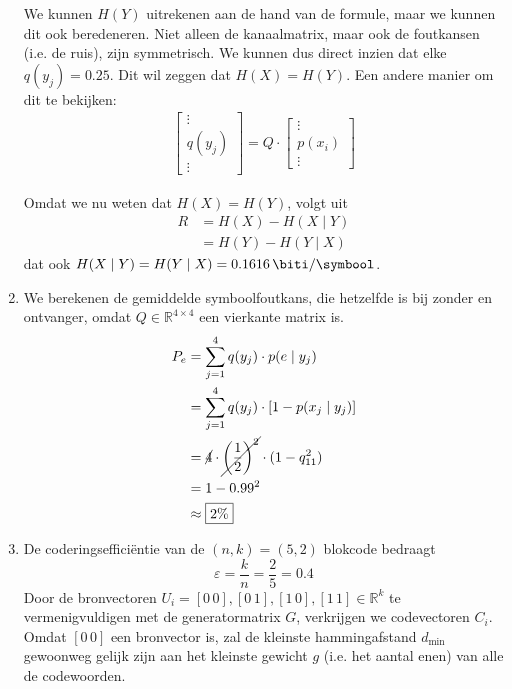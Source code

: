 \documentclass[kulak]{kulakarticle}
\newcommand{\R}{\mathbb{R}} %
\begin{document}
\begin{enumerate}
		We kunnen \(H(Y)\) uitrekenen aan de hand van de formule, maar we kunnen dit ook beredeneren. Niet alleen de kanaalmatrix, maar ook de foutkansen (i.e. de ruis), zijn symmetrisch. We kunnen dus direct inzien dat elke \(q(y_j) = 0.25\). Dit wil zeggen dat \(H(X)=H(Y)\). Een andere manier om dit te bekijken: \begin{align*}
			\begin{bmatrix}
				\vdots \\
				q(y_j) \\
				\vdots
			\end{bmatrix} = Q \cdot \begin{bmatrix}
			\vdots \\
			p(x_i) \\
			\vdots
			\end{bmatrix}
		\end{align*}

		Omdat we nu weten dat \(H(X)=H(Y)\), volgt uit \begin{align*}
			R&=H(X)-H(X \mid Y)\\&=H(Y)-H(Y\mid X)
		\end{align*} dat ook \(H(X\mid Y)=H(Y\mid X)=\SI{0.1616}{\biti \per \symbool}\).

		\item We berekenen de gemiddelde symboolfoutkans, die hetzelfde is bij zonder en ontvanger, omdat \(Q \in \R^{4\times 4}\) een vierkante matrix is.
		\begin{align*}
			P_e &= \sum_{j=1}^{4}q(y_j)\cdot p(e\mid y_j)\\
				&= \sum_{j=1}^{4}q(y_j)\cdot [1-p(x_j\mid y_j)]\\
				&= \cancel{4} \cdot\cancel{ \left(\frac{1}{2}\right)^2} \cdot (1-q_{11}^2)\\
				&= 1-0.99^2\\
				&\approx \boxed{2\%}
		\end{align*}

		\item De coderingsefficiëntie van de \((n,k)=(5,2)\) blokcode bedraagt \[\varepsilon = \frac{k}{n}=\frac{2}{5}=\boxed{0.4}\] Door de bronvectoren \(U_i = [0 \, 0],[0 \, 1],[1 \, 0], [1 \, 1] \in \R^k\) te vermenigvuldigen met de generatormatrix \(G\), verkrijgen we codevectoren \(C_i\). Omdat \([0 \, 0]\) een bronvector is, zal de kleinste hammingafstand \(d_{\text{min}}\) gewoonweg gelijk zijn aan het kleinste gewicht \(g\) (i.e. het aantal enen) van alle de codewoorden.


\end{enumerate}
\end{document}
